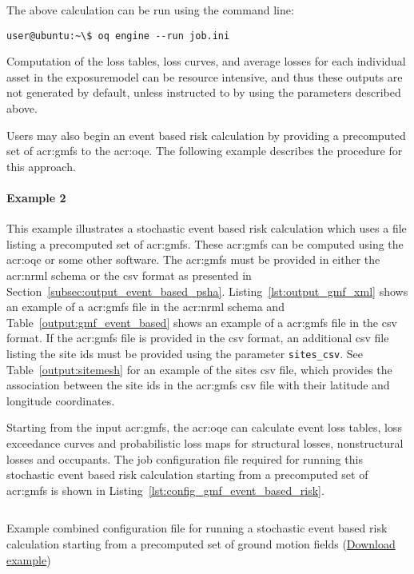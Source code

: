 The above calculation can be run using the command line:

\begin{verbatim}
user@ubuntu:~\$ oq engine --run job.ini
\end{verbatim}

Computation of the loss tables, loss curves, and average losses for each
individual \gls{asset} in the \gls{exposuremodel} can be resource intensive,
and thus these outputs are not generated by default, unless instructed to by
using the parameters described above.


Users may also begin an event based risk calculation by providing a precomputed
set of \glspl{acr:gmf} to the \gls{acr:oqe}. The following example describes the
procedure for this approach.


\paragraph{Example 2}

This example illustrates a stochastic event based risk calculation which uses
a file listing a precomputed set of \glspl{acr:gmf}. These \glspl{acr:gmf} can
be computed using the \glsdesc{acr:oqe} or some other software. The
\glspl{acr:gmf} must be provided in either the \gls{acr:nrml} schema or the
csv format as presented in Section~\ref{subsec:output_event_based_psha}.
Listing~\ref{lst:output_gmf_xml} shows an example of a \glspl{acr:gmf} file in
the \gls{acr:nrml} schema and Table~\ref{output:gmf_event_based} shows an
example of a \glspl{acr:gmf} file in the csv format. If the \glspl{acr:gmf}
file is provided in the csv format, an additional csv file listing the site
ids must be provided using the parameter \Verb+sites_csv+. See
Table~\ref{output:sitemesh} for an example of the sites csv file, which
provides the association between the site ids in the \glspl{acr:gmf} csv file
with their latitude and longitude coordinates.

Starting from the input \glspl{acr:gmf}, the \gls{acr:oqe} can calculate event
loss tables, loss exceedance curves and probabilistic loss maps for structural
losses, nonstructural losses and occupants. The
job configuration file required for running this stochastic event based risk
calculation starting from a precomputed set of \glspl{acr:gmf} is shown in
Listing~\ref{lst:config_gmf_event_based_risk}.

\begin{listing}[htbp]
  \inputminted[firstline=1,firstnumber=1,fontsize=\scriptsize
  ,frame=single,bgcolor=lightgray,linenos,label=job.ini]{ini}{oqum/risk/verbatim/config_gmf_event_based_risk.ini}
  \caption{Example combined configuration file for running a stochastic event based risk calculation starting from a precomputed set of ground motion fields (\href{https://raw.githubusercontent.com/gem/oq-engine/master/doc/manual/oqum/risk/verbatim/config_gmf_event_based_risk.ini}{Download example})}
  \label{lst:config_gmf_event_based_risk}
\end{listing}


